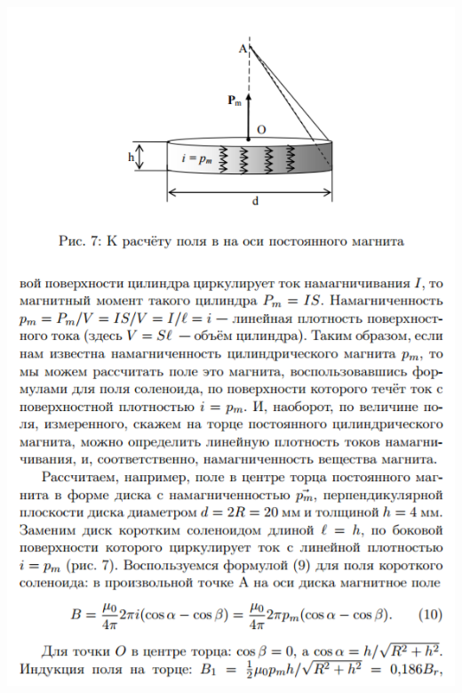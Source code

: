 \documentclass[12pt]{article}
\begin{document}
\begin{center}
	    \includegraphics[width=15cm]{theory9.png}

\end{center}
\end{document}
